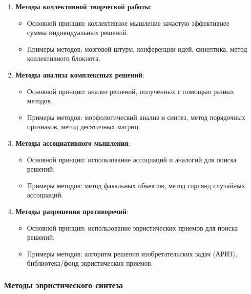 \documentclass[
]{article}
\providecommand{\tightlist}{%
  \setlength{\itemsep}{0pt}\setlength{\parskip}{0pt}}
\begin{document}
\begin{enumerate}
\def\labelenumi{\arabic{enumi}.}
\item
  \textbf{Методы коллективной творческой работы}:

  \begin{itemize}
  \tightlist
  \item
    Основной принцип: коллективное мышление зачастую эффективнее суммы
    индивидуальных решений.
  \item
    Примеры методов: мозговой штурм, конференции идей, синептика, метод
    коллективного блокнота.
  \end{itemize}
\item
  \textbf{Методы анализа комплексных решений}:

  \begin{itemize}
  \tightlist
  \item
    Основной принцип: анализ решений, полученных с помощью разных
    методов.
  \item
    Примеры методов: морфологический анализ и синтез, метод порядочных
    признаков, метод десятичных матриц.
  \end{itemize}
\item
  \textbf{Методы ассоциативного мышления}:

  \begin{itemize}
  \tightlist
  \item
    Основной принцип: использование ассоциаций и аналогий для поиска
    решений.
  \item
    Примеры методов: метод факальных объектов, метод гирлянд случайных
    ассоциаций.
  \end{itemize}
\item
  \textbf{Методы разрешения противоречий}:

  \begin{itemize}
  \tightlist
  \item
    Основной принцип: использование эвристических приемов для поиска
    решений.
  \item
    Примеры методов: алгоритм решения изобретательских задач (АРИЗ),
    библиотека/фонд эвристических приемов.
  \end{itemize}
\end{enumerate}

\subsubsection{\texorpdfstring{\textbf{Методы эвристического
синтеза}}{Методы эвристического синтеза}}\label{ux43cux435ux442ux43eux434ux44b-ux44dux432ux440ux438ux441ux442ux438ux447ux435ux441ux43aux43eux433ux43e-ux441ux438ux43dux442ux435ux437ux430}
\end{document}
